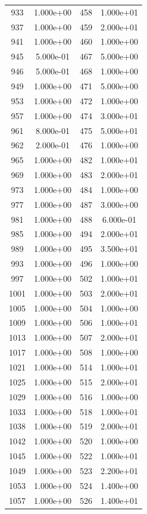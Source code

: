 \documentclass[12pt]{article}
\begin{document}
\begin{longtable}{@{}cccc@{}}
933 & 1.000e+00 & 458 & 1.000e+01 \\
937 & 1.000e+00 & 459 & 2.000e+01 \\
941 & 1.000e+00 & 460 & 1.000e+00 \\
945 & 5.000e-01 & 467 & 5.000e+00 \\
946 & 5.000e-01 & 468 & 1.000e+00 \\
949 & 1.000e+00 & 471 & 5.000e+00 \\
953 & 1.000e+00 & 472 & 1.000e+00 \\
957 & 1.000e+00 & 474 & 3.000e+01 \\
961 & 8.000e-01 & 475 & 5.000e+01 \\
962 & 2.000e-01 & 476 & 1.000e+00 \\
965 & 1.000e+00 & 482 & 1.000e+01 \\
969 & 1.000e+00 & 483 & 2.000e+01 \\
973 & 1.000e+00 & 484 & 1.000e+00 \\
977 & 1.000e+00 & 487 & 3.000e+00 \\
981 & 1.000e+00 & 488 & 6.000e-01 \\
985 & 1.000e+00 & 494 & 2.000e+01 \\
989 & 1.000e+00 & 495 & 3.500e+01 \\
993 & 1.000e+00 & 496 & 1.000e+00 \\
997 & 1.000e+00 & 502 & 1.000e+01 \\
1001 & 1.000e+00 & 503 & 2.000e+01 \\
1005 & 1.000e+00 & 504 & 1.000e+00 \\
1009 & 1.000e+00 & 506 & 1.000e+01 \\
1013 & 1.000e+00 & 507 & 2.000e+01 \\
1017 & 1.000e+00 & 508 & 1.000e+00 \\
1021 & 1.000e+00 & 514 & 1.000e+01 \\
1025 & 1.000e+00 & 515 & 2.000e+01 \\
1029 & 1.000e+00 & 516 & 1.000e+00 \\
1033 & 1.000e+00 & 518 & 1.000e+01 \\
1038 & 1.000e+00 & 519 & 2.000e+01 \\
1042 & 1.000e+00 & 520 & 1.000e+00 \\
1045 & 1.000e+00 & 522 & 1.000e+01 \\
1049 & 1.000e+00 & 523 & 2.200e+01 \\
1053 & 1.000e+00 & 524 & 1.400e+00 \\
1057 & 1.000e+00 & 526 & 1.400e+01 \\

\end{longtable}
\end{document}
